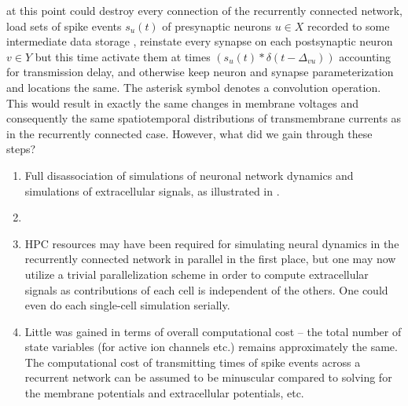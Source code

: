 at this point could destroy every connection of the recurrently connected network,
load sets of spike events $s_u(t)$ of presynaptic neurons $u \in X$ recorded to some intermediate data storage  ,
reinstate every synapse on each postsynaptic neuron $v \in Y$ but this time activate them at times
$\left(s_u(t) \ast \delta(t-\Delta_{vu})\right)$
accounting for transmission delay,
and otherwise keep neuron and synapse parameterization and locations the same.
The asterisk symbol denotes a convolution operation.
This would result in exactly the same changes in membrane voltages and consequently the same spatiotemporal distributions of transmembrane currents as in the recurrently connected case. 
However, what did we gain through these steps?

\begin{enumerate}
\item Full disassociation of simulations of neuronal network dynamics and simulations of extracellular signals,
as illustrated in .
\item {}
\item HPC resources may have been required for simulating neural dynamics in the recurrently connected network in parallel in the first place,
but one may now utilize a trivial parallelization scheme in order to compute extracellular signals as contributions of each cell is independent of the others.
One could even do each single-cell simulation serially.
\item Little was gained in terms of overall computational cost -- the total number of state variables (for active ion channels etc.) remains approximately the same.
The computational cost of transmitting times of spike events across a recurrent network can be assumed to be minuscular compared to solving for the membrane potentials and extracellular potentials, etc.
\end{enumerate}

